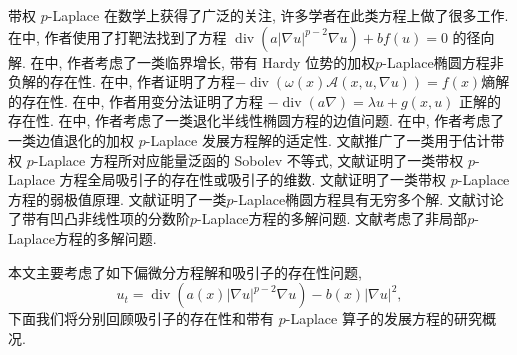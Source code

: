 \documentclass[oneside,longtitle]{LZUthesis}
\numberwithin{equation}{chapter}
\newcommand*\abs[1]{\lvert#1\rvert}
\DeclareMathOperator{\Div}{div}
\begin{document}
带权 $p$-Laplace 在数学上获得了广泛的关注, 许多学者在此类方程上做了很多工作.
在\citep{cortazarExistenceSignChanging2014}中,
作者使用了打靶法找到了方程 $\Div(a\abs{\nabla u}^{p-2}\nabla u) + bf(u) = 0$ 的径向解.
在\citep{musinaExistenceMultiplicityResults2009}中,
作者考虑了一类临界增长, 带有 Hardy 位势的加权$p$-Laplace椭圆方程非负解的存在性.
在\citep{cavalheiroWeightedSobolevSpaces2008}中,
作者证明了方程$-\Div(\omega(x)\mathcal{A}(x, u, \nabla u)) = f(x)$熵解的存在性.
在\citep{caldiroliVariationalDegenerateElliptic2000}中,
作者用变分法证明了方程 $-\Div(a\nabla) = \lambda u + g(x, u)$ 正解的存在性.
在\citep{leBoundaryValueProblems1998}中,
作者考虑了一类退化半线性椭圆方程的边值问题.
在\citep{yinEvolutionaryWeightedPLaplacian2007}中,
作者考虑了一类边值退化的加权 $p$-Laplace 发展方程解的适定性.
文献\citep{gazziniSobolevtypeInequalityRelated2009}推广了一类用于估计带权 $p$-Laplace 方程所对应能量泛函的 Sobolev 不等式,
文献\citep{liLongtimeBehaviorClass2014b,maGlobalAttractorsWeighted2012a,galClassDegenerateParabolic2012}证明了一类带权 $p$-Laplace 方程全局吸引子的存在性或吸引子的维数.
文献\citep{monticelliMaximumPrinciplesWeak2009}证明了一类带权 $p$-Laplace 方程的弱极值原理.
文献\citep{dengInfinitelyManySolutions2019}证明了一类$p$-Laplace椭圆方程具有无穷多个解.
文献\citep{chenMultipleSolutionsFractional2020}讨论了带有凹凸非线性项的分数阶$p$-Laplace方程的多解问题.
文献\citep{oanhMultiplicitySolutionsNonlocal2020}考虑了非局部$p$-Laplace方程的多解问题.

本文主要考虑了如下偏微分方程解和吸引子的存在性问题,
\begin{equation*}
	u_t = \Div(a(x)\abs{\nabla u}^{p-2}\nabla u) - b(x)\abs{\nabla u}^2,
\end{equation*}
下面我们将分别回顾吸引子的存在性和带有 $p$-Laplace 算子的发展方程的研究概况.
\end{document}
